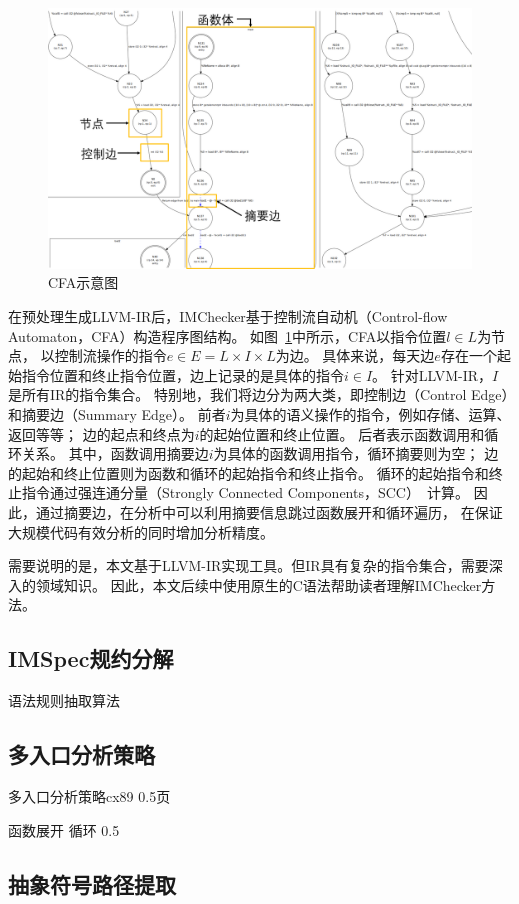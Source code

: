 \begin{figure}[t]
	\centering
	\includegraphics[width=0.7\linewidth]{figures/cp3-3-cfa.png}
	\caption{
		CFA示意图
	}
	\label{fig:3-3-cfa}
\end{figure}

在预处理生成LLVM-IR后，IMChecker基于控制流自动机（Control-flow Automaton，CFA）构造程序图结构。
如图~\ref{fig:3-3-cfa}中所示，CFA以指令位置$l \in L$为节点，
以控制流操作的指令$e \in E = L \times I \times L$为边。
具体来说，每天边$e$存在一个起始指令位置和终止指令位置，边上记录的是具体的指令$i \in I$。
针对LLVM-IR，$I$是所有IR的指令集合。
特别地，我们将边分为两大类，即控制边（Control Edge）和摘要边（Summary Edge）。
前者$i$为具体的语义操作的指令，例如存储、运算、返回等等；
边的起点和终点为$i$的起始位置和终止位置。
后者表示函数调用和循环关系。
其中，函数调用摘要边$i$为具体的函数调用指令，循环摘要则为空；
边的起始和终止位置则为函数和循环的起始指令和终止指令。
循环的起始指令和终止指令通过强连通分量（Strongly Connected Components，SCC）~\cite{12-ele-scc}计算。
因此，通过摘要边，在分析中可以利用摘要信息跳过函数展开和循环遍历，
在保证大规模代码有效分析的同时增加分析精度。


需要说明的是，本文基于LLVM-IR实现工具。但IR具有复杂的指令集合，需要深入的领域知识。
因此，本文后续中使用原生的C语法帮助读者理解IMChecker方法。

\subsection{IMSpec规约分解}
语法规则抽取算法

\subsection{多入口分析策略}
多入口分析策略cx89
0.5页

函数展开
循环
0.5
\subsection{抽象符号路径提取}

